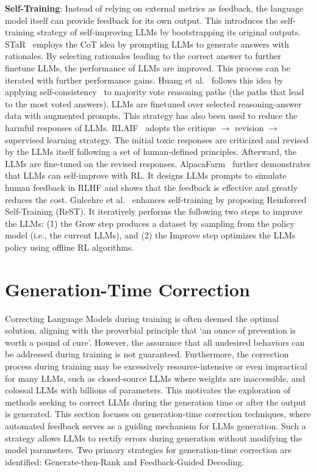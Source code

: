 \documentclass[a4paper,oneside]{book}
\begin{document}
\textbf{Self-Training}: Instead of relying on external metrics as feedback, the language model itself can provide feedback for its own output. This introduces the self-training strategy of self-improving LLMs by bootstrapping its original outputs. STaR~\cite{zelikman2022star} employs the CoT idea by prompting LLMs to generate answers with rationales. By selecting rationales leading to the correct answer to further finetune LLMs, the performance of LLMs are improved. This process can be iterated with further performance gains. Huang et al.~\cite{huang2022large} follows this idea by applying self-consistency~\cite{wang2023selfconsistency} to majority vote reasoning paths (the paths that lead to the most voted answers). LLMs are finetuned over selected reasoning-answer data with augmented prompts. This strategy has also been used to reduce the harmful responses of LLMs. RLAIF~\cite{bai2022training} adopts the critique $\rightarrow$ revision $\rightarrow$ supervised learning strategy. The initial toxic responses are criticized and revised by the LLMs itself following a set of human-defined principles. Afterward, the LLMs are fine-tuned on the revised responses. AlpacaFarm~\cite{dubois2024alpacafarm} further demonstrates that LLMs can self-improve with RL. It designs LLMs prompts to simulate human feedback in RLHF and shows that the feedback is effective and greatly reduces the cost. Gulcehre et al.~\cite{gulcehre2023reinforced} enhances self-training by proposing Reinforced Self-Training (ReST). It iteratively performs the following two steps to improve the LLMs: (1) the Grow step produces a dataset by sampling from the policy model (i.e., the current LLMs), and (2) the Improve step optimizes the LLMs policy using offline RL algorithms.

\section{Generation-Time Correction}
Correcting Language Models during training is often deemed the optimal solution, aligning with the proverbial principle that `an ounce of prevention is worth a pound of cure'. However, the assurance that all undesired behaviors can be addressed during training is not guaranteed. Furthermore, the correction process during training may be excessively resource-intensive or even impractical for many LLMs, such as closed-source LLMs where weights are inaccessible, and colossal LLMs with billions of parameters. This motivates the exploration of methods seeking to correct LLMs during the generation time or after the output is generated. This section focuses on generation-time correction techniques, where automated feedback serves as a guiding mechanism for LLMs generation. Such a strategy allows LLMs to rectify errors during generation without modifying the model parameters. Two primary strategies for generation-time correction are identified: Generate-then-Rank and Feedback-Guided Decoding.
\end{document}
